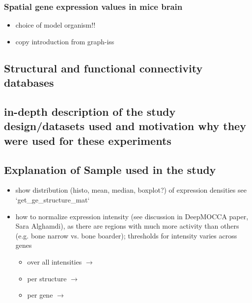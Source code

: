 \documentclass[]{article}
\begin{document}
\subsubsection{Spatial gene expression values in mice brain}
\begin{itemize}
	\item choice of model organism!!
	\item copy introduction from graph-iss
\end{itemize}

\subsection{Structural and functional connectivity databases}


\subsection*{in-depth description of the study design/datasets used and motivation why they were used for these experiments}
\subsection*{Explanation of Sample used in the study}
\begin{itemize}
	\item show distribution (histo, mean, median, boxplot?) of expression densities see `get\_ge\_structure\_mat`

	\item how to normalize expression intensity (see discussion in DeepMOCCA paper, Sara Alghamdi), as there are regions with much more activity than others (e.g. bone narrow vs. bone boarder); thresholds for intensity varies across genes
	
	\begin{itemize}
		\item over all intensities $\rightarrow$
		\item per structure $\rightarrow$  
		\item per gene $\rightarrow$ 
	\end{itemize}
\end{itemize}
\end{document}

